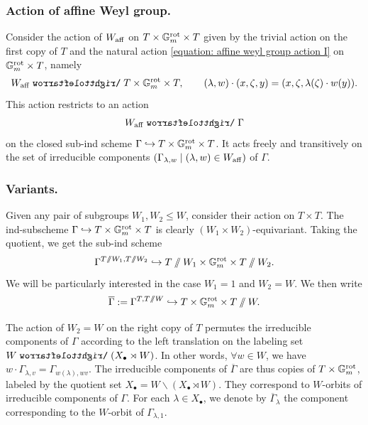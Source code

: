 \subsubsection{Action of affine Weyl group.}\label{section: actions}
Consider the action of $W_{\mathrm{aff}}$ on $T \times \mathbb{G}_m^{\mathrm{rot}} \times T$ given by the trivial action on the first copy of $T$ and the natural action \eqref{equation: affine weyl group action I} on $\mathbb{G}_m^{\mathrm{rot}} \times T$, namely
\begin{equation*}
   W_{\aff} \acts T \times \Gm^{\rot} \times T, \qquad (\lambda, w) \cdot (x, \zeta, y) = (x, \zeta, \lambda(\zeta) \cdot w(y)). 
\end{equation*}
This action restricts to an action
\begin{equation}\label{equation: affine weyl group action on cocharacter graphs}
W_{\aff} \acts \Gamma    
\end{equation}
on the closed sub-ind scheme $\Gamma \hookrightarrow T \times \mathbb{G}_m^{\mathrm{rot}} \times T$. It acts freely and transitively on the set of irreducible components $(\Gamma_{\lambda, w} \mid (\lambda, w) \in W_{\mathrm{aff}})$ of $\Gamma$.

\subsubsection{Variants.}\label{section: variants}
Given any pair of subgroups $W_1, W_2 \leq W$, consider their action on $T \times T$. The ind-subscheme $\Gamma \hookrightarrow T \times \mathbb{G}_m^{\mathrm{rot}} \times T$ is clearly $(W_1 \times W_2)$-equivariant. Taking the quotient, we get the sub-ind scheme
\begin{equation*}
    \Gamma^{T \sslash W_1,  T \sslash W_2} \hookrightarrow T\sslash W_1 \times \mathbb{G}_m^{\mathrm{rot}} \times T \sslash W_2.
\end{equation*}
We will be particularly interested in the case $W_1= 1$ and $W_2 = W$. We then write
\begin{equation*}
    \overline{\Gamma} := \Gamma^{T,  T \sslash W} \hookrightarrow T \times \mathbb{G}_m^{\mathrm{rot}} \times T \sslash W.
\end{equation*}

The action of $W_2=W$ on the right copy of $T$ permutes the irreducible components of $\Gamma$ according to the left translation on the labeling set $W \acts (X_{\bullet} \rtimes W)$. In other words, $\forall w \in W$, we have $w \cdot \Gamma_{\lambda, v} = \Gamma_{w(\lambda), wv}$.
The irreducible components of $\overline{\Gamma}$ are thus copies of $T \times \mathbb{G}_m^{\mathrm{rot}}$, labeled by the quotient set $X_{\bullet} = W \backslash (X_{\bullet} \rtimes W)$. They correspond to $W$-orbits of irreducible components of $\Gamma$. 
For each $\lambda \in X_{\bullet}$, we denote by $\overline{\Gamma}_{\lambda}$ the component corresponding to the $W$-orbit of $\Gamma_{\lambda, 1}$.   




